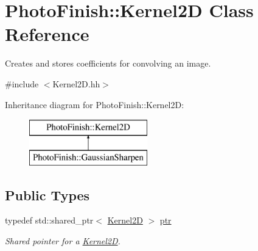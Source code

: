 \hypertarget{class_photo_finish_1_1_kernel2_d}{}\section{Photo\+Finish\+:\+:Kernel2D Class Reference}
\label{class_photo_finish_1_1_kernel2_d}


Creates and stores coefficients for convolving an image.  




{\ttfamily \#include $<$Kernel2\+D.\+hh$>$}

Inheritance diagram for Photo\+Finish\+:\+:Kernel2D\+:\begin{figure}[H]
\begin{center}
\leavevmode
\includegraphics[height=2.000000cm]{class_photo_finish_1_1_kernel2_d}
\end{center}
\end{figure}
\subsection*{Public Types}
\begin{DoxyCompactItemize}
\item 
typedef std\+::shared\+\_\+ptr$<$ \hyperlink{class_photo_finish_1_1_kernel2_d}{Kernel2D} $>$ \hyperlink{class_photo_finish_1_1_kernel2_d_a7a209c34b3c8edb54835f1bab1244970}{ptr}
\begin{DoxyCompactList}\small\item\em Shared pointer for a \hyperlink{class_photo_finish_1_1_kernel2_d}{Kernel2D}. \end{DoxyCompactList}\end{DoxyCompactItemize}
